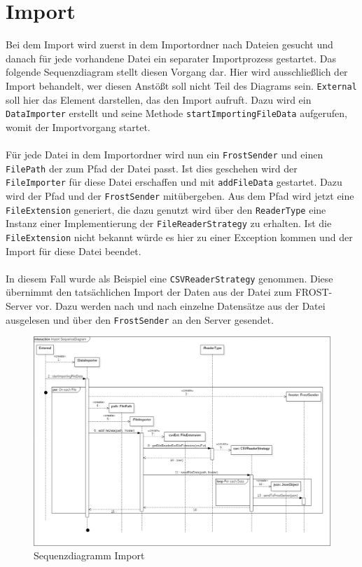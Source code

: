 \section{Import}
Bei dem Import wird zuerst in dem Importordner nach Dateien gesucht und danach für jede vorhandene Datei ein separater Importprozess gestartet. Das folgende Sequenzdiagram stellt diesen Vorgang dar. Hier wird ausschließlich der Import behandelt, wer diesen Anstößt soll nicht Teil des Diagrams sein. \texttt{External} soll hier das Element darstellen, das den Import aufruft. Dazu wird ein \texttt{DataImporter} erstellt und seine Methode \texttt{startImportingFileData} aufgerufen, womit der Importvorgang startet.\\\\
Für jede Datei in dem Importordner wird nun ein \texttt{FrostSender} und einen \texttt{FilePath} der zum Pfad der Datei passt. Ist dies geschehen wird der \texttt{FileImporter} für diese Datei erschaffen und mit \texttt{addFileData} gestartet. Dazu wird der Pfad und der \texttt{FrostSender} mitübergeben. Aus dem Pfad wird jetzt eine \texttt{FileExtension} generiert, die dazu genutzt wird über den \texttt{ReaderType} eine Instanz einer Implementierung der \texttt{FileReaderStrategy} zu erhalten. Ist die \texttt{FileExtension} nicht bekannt würde es hier zu einer Exception kommen und der Import für diese Datei beendet.\\\\
In diesem Fall wurde als Beispiel eine \texttt{CSVReaderStrategy} genommen. Diese übernimmt den tatsächlichen Import der Daten aus der Datei zum FROST-Server vor. Dazu werden nach und nach einzelne Datensätze aus der Datei ausgelesen und über den \texttt{FrostSender} an den Server gesendet.
\begin{figure}[!hbp]
	\centering
	\includegraphics[width=0.9\linewidth]{images/import/ImportSequenceDiagram.png}
	\caption{Sequenzdiagramm Import}
\end{figure}
\newpage

